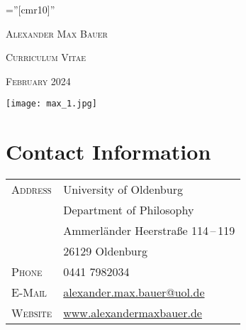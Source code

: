 \documentclass[a4paper,10pt]{article}
\begin{document}
\pagestyle{plain}
\font\fb=''[cmr10]''

\par{\centering
   {\Huge\textsc{Alexander Max Bauer}
   }\bigskip\par}

\par{\centering
   {\Large\textsc{Curriculum Vitae}
   }\bigskip\par}

\par{\centering
   {\Large\textsc{February 2024}
   }\bigskip\par}

\vspace{2cm}
\begin{center}
   \texttt{[image: max\_1.jpg]}
\end{center}
\vspace{2cm}


\section{Contact Information}
\begin{longtable}{p{}p{}}
   \textsc{Address}     & University of Oldenburg\\
                        & Department of Philosophy\\
                        & Ammerländer Heerstraße 114\,--\,119\\
                        & 26129 Oldenburg\\
   \textsc{Phone}       & 0441 7982034\\
   \textsc{E-Mail}      & \href{mailto:alexander.max.bauer@uol.de}{alexander.max.bauer@uol.de}\\
   \textsc{Website}     & \href{http://www.alexandermaxbauer.de/}{www.alexandermaxbauer.de}
\end{longtable}


\clearpage
\end{document}
